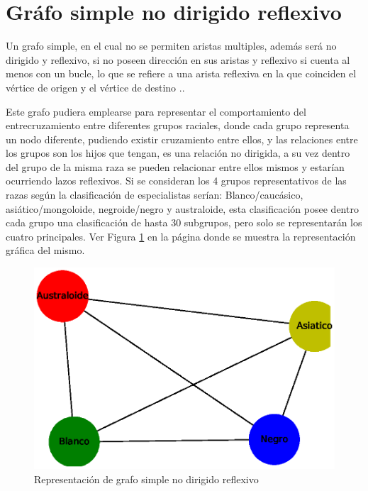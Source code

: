 \documentclass{article}
\begin{document}
\section{Gráfo simple no dirigido reflexivo}

Un grafo simple, en el cual  no se permiten aristas multiples, además será no dirigido y reflexivo, si no poseen dirección en sus aristas y reflexivo si cuenta al menos con un bucle, lo que se refiere a una arista reflexiva en la que coinciden el vértice de origen y el vértice de destino .\cite{Elisa}. 

Este grafo pudiera emplearse para representar el comportamiento del entrecruzamiento entre diferentes grupos raciales, donde cada grupo representa un nodo diferente, pudiendo existir cruzamiento entre ellos, y las relaciones entre los grupos son los hijos que tengan, es una relación no dirigida, a su vez dentro del grupo de la misma raza se pueden relacionar entre ellos mismos y estarían ocurriendo lazos reflexivos. Si se consideran los 4 grupos representativos de las razas según la clasificación de especialistas serían: Blanco/caucásico, asiático/mongoloide, negroide/negro y australoide, esta clasificación posee dentro cada grupo una clasificación de hasta 30 subgrupos, pero solo se representarán los cuatro principales. Ver Figura \ref{fig:Fig03} en la página \pageref{fig:Fig03} donde se muestra la representación gráfica del mismo.



\begin{figure}
    \centering
    \includegraphics[scale=0.4]{imagenes/Fig03.eps}
    \caption{Representación de grafo simple no dirigido reflexivo}
    \label{fig:Fig03}
\end{figure}
\end{document}
